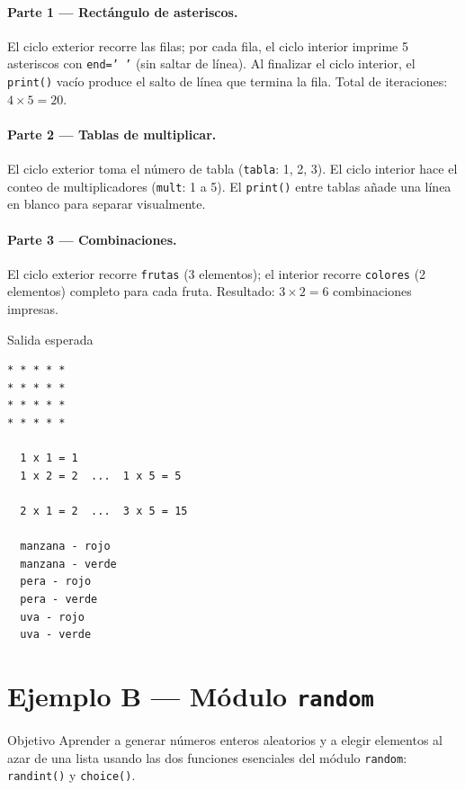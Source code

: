 \documentclass[12pt,a4paper]{article}
\begin{document}
\paragraph{Parte 1 — Rectángulo de asteriscos.}
El ciclo exterior recorre las filas; por cada fila, el ciclo interior
imprime 5 asteriscos con \texttt{end=' '} (sin saltar de línea).
Al finalizar el ciclo interior, el \texttt{print()} vacío produce
el salto de línea que termina la fila.  Total de iteraciones: $4 \times 5 = 20$.

\paragraph{Parte 2 — Tablas de multiplicar.}
El ciclo exterior toma el número de tabla (\texttt{tabla}: 1, 2, 3).
El ciclo interior hace el conteo de multiplicadores (\texttt{mult}: 1 a 5).
El \texttt{print()} entre tablas añade una línea en blanco para separar visualmente.

\paragraph{Parte 3 — Combinaciones.}
El ciclo exterior recorre \texttt{frutas} (3 elementos);
el interior recorre \texttt{colores} (2 elementos) completo para cada fruta.
Resultado: $3 \times 2 = 6$ combinaciones impresas.

\vspace{0.6em}
\begin{salidabox}{Salida esperada}
\begin{lstlisting}[style=OutputStyle]
* * * * *
* * * * *
* * * * *
* * * * *

  1 x 1 = 1
  1 x 2 = 2  ...  1 x 5 = 5

  2 x 1 = 2  ...  3 x 5 = 15

  manzana - rojo
  manzana - verde
  pera - rojo
  pera - verde
  uva - rojo
  uva - verde
\end{lstlisting}
\end{salidabox}

\newpage
\section{Ejemplo B — Módulo \texttt{random}}
\label{sec:ejemploB}

\begin{objetivobox}{Objetivo}
Aprender a generar números enteros aleatorios y a elegir elementos
al azar de una lista usando las dos funciones esenciales del módulo
\texttt{random}: \texttt{randint()} y \texttt{choice()}.
\end{objetivobox}
\end{document}
